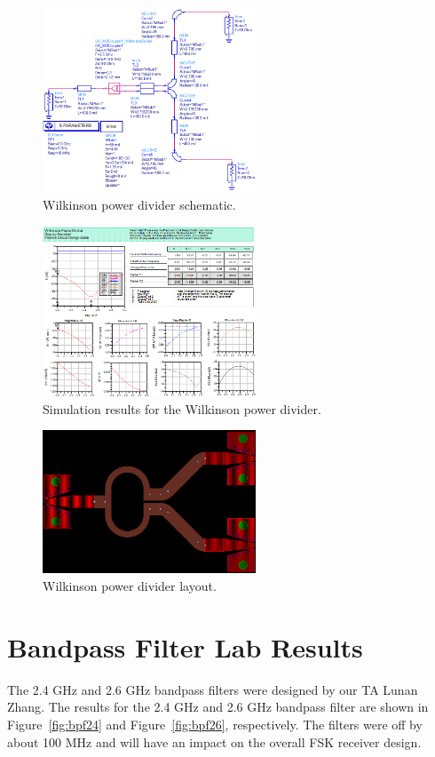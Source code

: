 \documentclass[conference]{IEEEtran}
\begin{document}
\begin{figure}[!htb]
\centering
\includegraphics[width=2.5in]{wilkinson-pics/wilkinson-schematic.png}
\caption{Wilkinson power divider schematic.}
\label{fig:WDSchematic}
\end{figure}

\begin{figure}[!htb]
\centering
\includegraphics[width=2.5in]{wilkinson-pics/wilkinson-simulation.png}
\caption{Simulation results for the Wilkinson power divider.}
\label{fig:WDSim}
\end{figure}

\begin{figure}[!htb]
\centering
\includegraphics[width=2.5in]{wilkinson-pics/wilkinson-layout.png}
\caption{Wilkinson power divider layout.}
\label{fig:WDLayout}
\end{figure}

\section{Bandpass Filter Lab Results}
The 2.4 GHz and 2.6 GHz bandpass filters were designed by our TA Lunan Zhang\cite{lunan}.  The results for the 2.4 GHz and 2.6 GHz bandpass filter are shown in Figure~\ref{fig:bpf24} and Figure~\ref{fig:bpf26}, respectively.  The filters were off by about 100 MHz and will have an impact on the overall FSK receiver design.
\end{document}
